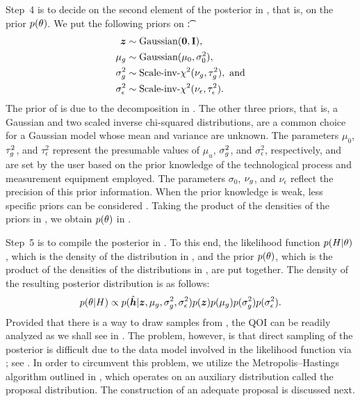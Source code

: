 Step~4 is to decide on the second element of the posterior in
, that is, on the prior $p(\theta)$. We put the following priors
on \t:
\begin{align} \elab{inference-prior}
  \begin{split}
    \vz               & \sim \text{Gaussian}(\v{0}, \m{I}), \\
    \mu_\g            & \sim \text{Gaussian}(\mu_0, \sigma^2_0), \\
    \sigma^2_\g       & \sim \text{Scale-inv-$\chi^2$}(\nu_\g, \tau^2_\g), \text{ and} \\
    \sigma^2_\epsilon & \sim \text{Scale-inv-$\chi^2$}(\nu_\epsilon, \tau^2_\epsilon).
  \end{split}
\end{align}
The prior of \vz is due to the decomposition in . The
other three priors, that is, a Gaussian and two scaled inverse chi-squared
distributions, are a common choice for a Gaussian model whose mean and variance
are unknown. The parameters $\mu_0$, $\tau^2_g$, and $\tau^2_\epsilon$
represent the presumable values of $\mu_u$, $\sigma^2_g$, and
$\sigma^2_\epsilon$, respectively, and are set by the user based on the prior
knowledge of the technological process and measurement equipment employed. The
parameters $\sigma_0$, $\nu_g$, and $\nu_\epsilon$ reflect the precision of
this prior information. When the prior knowledge is weak, less specific priors
can be considered \cite{gelman2004}. Taking the product of the densities of the
priors in , we obtain $p(\theta)$ in .

Step~5 is to compile the posterior in . To this end, the
likelihood function $p(H | \theta)$, which is the density of the distribution in
, and the prior $p(\theta)$, which is the product of the
densities of the distributions in , are put together. The
density of the resulting posterior distribution is as follows:
\begin{equation} \elab{inference-posterior}
  p(\t | H) \propto p(\hvh | \vz, \mu_\g, \sigma^2_\g, \sigma^2_\epsilon) p(\vz) p(\mu_\g) p(\sigma^2_\g) p(\sigma^2_\epsilon).
\end{equation}
Provided that there is a way to draw samples from ,
the \ac{QOI} can be readily analyzed as we shall see in
. The problem, however, is that direct sampling
of the posterior is difficult due to the data model involved in the likelihood
function via \vh; see . In order to circumvent this
problem, we utilize the Metropolis--Hastings algorithm \cite{gelman2004}
outlined in , which operates on an auxiliary
distribution called the proposal distribution. The construction of an adequate
proposal is discussed next.


